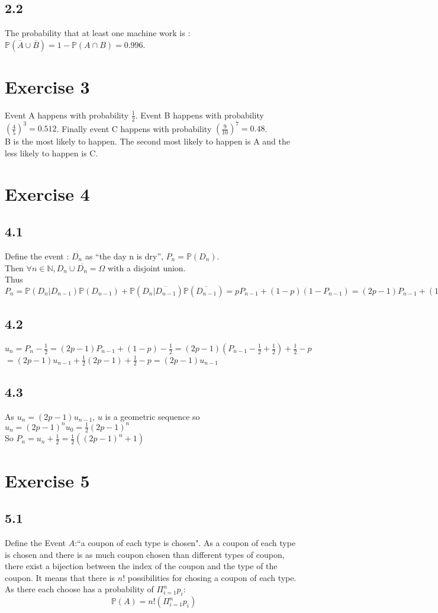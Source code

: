 \documentclass{article}
\begin{document}
\subsection*{2.2}
The probability that at least one machine work is : $\mathbb{P}(\overline{A}\cup\overline{B}) = 1 - \mathbb{P}(A\cap B) = 0.996$.
\section*{Exercise 3}
Event A happens with probability $\frac{1}{2}$. Event B happens with probability $(\frac{4}{5})^3=0.512$. Finally event C happens with probability $(\frac{9}{10})^7 = 0.48$.
\\
B is the most likely to happen. The second most likely to happen is A and the less likely to happen is C.
\section*{Exercise 4}
\subsection*{4.1}
Define the event : $D_n$ as ``the day n is dry'', $P_n=\mathbb{P}(D_n)$.
\\
Then $\forall n \in \mathbb{N}, D_n\cup\overline{D_n} = \Omega$ with a disjoint union. \\
Thus $P_n = \mathbb{P}(D_n|D_{n-1})\mathbb{P}(D_{n-1})+\mathbb{P}(D_n|\overline{D_{n-1}})\mathbb{P}(\overline{D_{n-1}}) = pP_{n-1}+(1-p)(1-P_{n-1}) = (2p-1)P_{n-1}+(1-p)$
\subsection*{4.2}
$u_n = P_n-\frac{1}{2} = (2p-1)P_{n-1}+(1-p)-\frac{1}{2} = (2p-1)(P_{n-1}-\frac{1}{2}+\frac{1}{2})+\frac{1}{2}-p$ 
\\
$= (2p-1)u_{n-1} + \frac{1}{2}(2p -1)+\frac{1}{2}-p = (2p-1)u_{n-1}$
\subsection*{4.3}
As $u_n = (2p-1)u_{n-1}$, $u$ is a geometric sequence so $u_n = (2p-1)^n u_0 = \frac{1}{2}(2p-1)^n$\\
So $P_n=u_n +\frac{1}{2} = \frac{1}{2}((2p-1)^n+1)$
\section*{Exercise 5}
\subsection*{5.1}
Define the Event $A$:``a coupon of each type is chosen". As a coupon of each type is
 chosen and there is as much coupon chosen than different types of coupon, there exist a bijection
 between the index of the coupon and the type of the coupon. It means that there is $n!$ possibilities for chosing a coupon of
 each type. \\
 As there each choose has a probability of $\Pi_{i=1}^n p_i$:  $$\boxed{ \mathbb{P}(A) = n!(\Pi_{i=1}^n p_i) }$$
\end{document}

